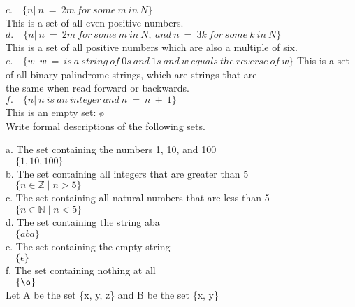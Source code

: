 \documentclass[12pt]{article}
\begin{document}
$c. \quad \{n |\ n \ = \ 2m \ for \ some \ m \ in \ N\} $ \\
\indent
This is a set of all even positive numbers. \\

$d. \quad \{n |\ n \ = \ 2m \ for \ some \ m \ in \ N, \
and \ n \ = \ 3k \ for \ some \ k \ in \ N\} $ \\
\indent
This is a set of all positive numbers which are also a multiple of six. \\

$e. \quad \{w |\ w \ = \ is \ a \ string \ of \ 0s \
and \ 1s \ and \ w \ equals \ the \ reverse \ of \ w \} $
\indent
This is a set of all binary palindrome strings, which are strings that are \\
\indent
the same when read forward or backwards. \\

$f. \quad \{n |\ n \ is \ an \ integer \ and \ n \ = \ n \ + \ 1 \} $ \\
\indent
This is an empty set: \o \\

 \quad Write formal descriptions of the following sets.

a. The set containing the numbers 1, 10, and 100 \\
\indent
$ \quad \{1, 10, 100\} $ \\

b. The set containing all integers that are greater than 5 \\
\indent
$ \quad \{n \in \mathbb{Z} \mid n > 5\} $ \\

c. The set containing all natural numbers that are less than 5 \\
\indent
$ \quad \{n \in \mathbb{N} \mid n < 5\} $ \\

d. The set containing the string aba \\
\indent
$ \quad \{aba\} $ \\

e. The set containing the empty string \\
\indent
$ \quad \{\epsilon\} $ \\

f. The set containing nothing at all \\
\indent
$ \quad \{\o\} $ \\

 \quad Let A be the set \{x, y, z\} and B be the set \{x, y\}
\end{document}
